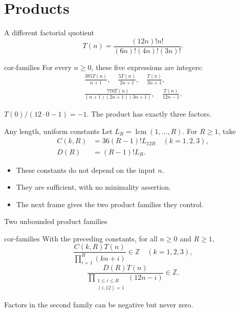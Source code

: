 \documentclass{beamer}
\begin{document}
\section{Products}
\begin{frame}{A different factorial quotient}
\[
T(n)=\frac{(12n)!n!}{(6n)!(4n)!(3n)!}.
\]
\begin{bookresult}{cor-families}
For every $n\geq0$, these five expressions are integers:
\[
\begin{gathered}
\frac{385T(n)}{n+1},\quad\frac{5T(n)}{2n+1},\quad\frac{T(n)}{3n+1},\\
\frac{770T(n)}{(n+1)(2n+1)(3n+1)},\quad\frac{T(n)}{12n-1}.
\end{gathered}
\]
\end{bookresult}
$T(0)/(12\cdot0-1)=-1$. The product has exactly three factors.
\end{frame}
\begin{frame}{Any length, uniform constants}
Let $L_R=\operatorname{lcm}(1,\ldots,R)$. For $R\geq1$, take
\[
\begin{aligned}
C(k,R)&=36(R-1)!L_{12R}\quad(k=1,2,3),\\
D(R)&=(R-1)!L_R.
\end{aligned}
\]
\begin{itemize}
\item These constants do not depend on the input $n$.
\item They are sufficient, with no minimality assertion.
\item The next frame gives the two product families they control.
\end{itemize}
\end{frame}
\begin{frame}{Two unbounded product families}
\begin{bookresult}{cor-families}
With the preceding constants, for all $n\geq0$ and $R\geq1$,
\[
\frac{C(k,R)T(n)}{\prod_{i=1}^R(kn+i)}\in\mathbb Z\quad(k=1,2,3),
\]
\[
\frac{D(R)T(n)}{\prod_{\substack{1\leq i\leq R\\(i,12)=1}}(12n-i)}\in\mathbb Z.
\]
\end{bookresult}
Factors in the second family can be negative but never zero.
\end{frame}
\end{document}
